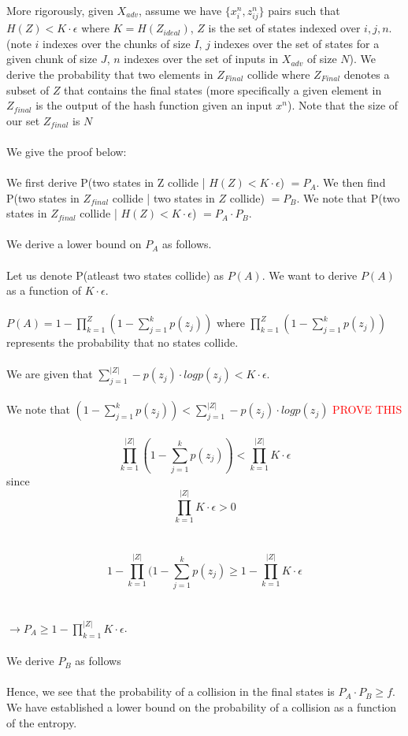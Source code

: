 \documentclass[letterpaper,twocolumn,10pt]{article}
\begin{document}
More rigorously, given $X_{adv}$, assume we have $\{x_{i}^{n}, z_{ij}^{n}\}$ pairs such that $H(Z) < K \cdot \epsilon$ where $K = H(Z_{ideal})$, $Z$ is the set of states indexed over $i, j, n$. (note $i$ indexes over the chunks of size $I$, $j$ indexes over the set of states for a given chunk of size $J$, $n$ indexes over the set of inputs in $X_{adv}$ of size $N$). We derive the probability that two elements in $Z_{Final}$ collide where $Z_{Final}$ denotes a subset of $Z$ that contains the final states (more specifically a given element in $Z_{final}$ is the output of the hash function given an input $x^{n}$). Note that the size of our set $Z_{final}$ is $N$ 
\\
\\
We give the proof below:
\\
\\
We first derive P(two states in Z collide | $H(Z) < K \cdot \epsilon$) $= P_{A}$. We then find P(two states in $Z_{final}$ collide | two states in $Z$ collide) $= P_{B}$. We note that P(two states in $Z_{final}$ collide |  $H(Z) < K \cdot \epsilon$) $=  P_{A} \cdot P_{B}$. 
\\
\\
We derive a lower bound on $P_{A}$ as follows.
\\
\\
Let us denote P(atleast two states collide) as $P(A)$. We want to derive $P(A)$ as a function of $K \cdot \epsilon$. 
\\
\\
$P(A) = 1 - \prod_{k=1}^{Z} (1- \sum_{j=1}^{k} p(z_{j}))$ where $\prod_{k=1}^{Z} (1- \sum_{j=1}^{k} p(z_{j}))$ represents the probability that no states collide. 
\\
\\
We are given that $\sum_{j=1}^{|Z|} -p(z_{j}) \cdot log p(z_{j}) < K \cdot \epsilon$. 
\\
\\
We note that $(1 - \sum_{j=1}^{k} p(z_{j})) < \sum_{j=1}^{|Z|} -p(z_{j}) \cdot log p(z_{j})$ \textcolor{red}{PROVE THIS}
\\
\\
$$ \prod_{k=1}^{|Z|} (1 - \sum_{j=1}^{k} p(z_{j})) < \prod_{k=1}^{|Z|} K \cdot \epsilon$$ since $$\prod_{k=1}^{|Z|} K \cdot \epsilon > 0$$
\\
\\
$$ 1 - \prod_{k=1}^{|Z|} (1 - \sum_{j=1}^{k} p(z_{j}) \geq 1 - \prod_{k=1}^{|Z|} K \cdot \epsilon$$
\\
\\
$\rightarrow P_{A} \geq 1 - \prod_{k=1}^{|Z|} K \cdot \epsilon$. 
\\
\\
We derive $P_{B}$ as follows
\\
\\
Hence, we see that the probability of a collision in the final states is $P_{A} \cdot P_{B} \geq f$. We have established a lower bound on the probability of a collision as a function of the entropy.
\end{document}
